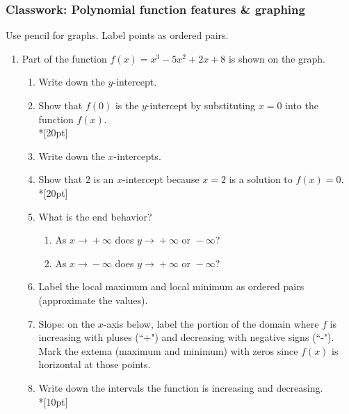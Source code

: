 \documentclass[12pt, twoside]{article}
\begin{document}
\subsubsection*{Classwork: Polynomial function features \& graphing}
Use pencil for graphs. Label points as ordered pairs.
\begin{enumerate}

\item Part of the function $f(x)=x^3-5x^2+2x+8$
      is shown on the graph.




\begin{enumerate}
    \item Write down the $y$-intercept.
    \item Show that $f(0)$ is the $y$-intercept by substituting $x=0$ into the function $f(x)$.\\*[20pt]
    \item Write down the $x$-intercepts.
    \item Show that $2$ is an $x$-intercept because $x=2$ is a solution to $f(x)=0$.\\*[20pt]
    \item What is the end behavior?
    \begin{enumerate}
        \item As $x\xrightarrow{}+\infty$ does $y\xrightarrow{}+\infty \text{ or } -\infty$?
        \item As $x\xrightarrow{}-\infty$ does $y\xrightarrow{}+\infty \text{ or } -\infty$?
    \end{enumerate}
    \item Label the local maximum and local minimum as ordered pairs (approximate the values).
    \item Slope: on the $x$-axis below, label the portion of the domain where $f$ is increasing with pluses (``+") and decreasing with negative signs (``-"). Mark the extema (maximum and minimum) with zeros since $f(x)$ is horizontal at those points.
    \item Write down the intervals the function is increasing and decreasing.\\*[10pt]
\end{enumerate}


\end{enumerate}
\end{document}

